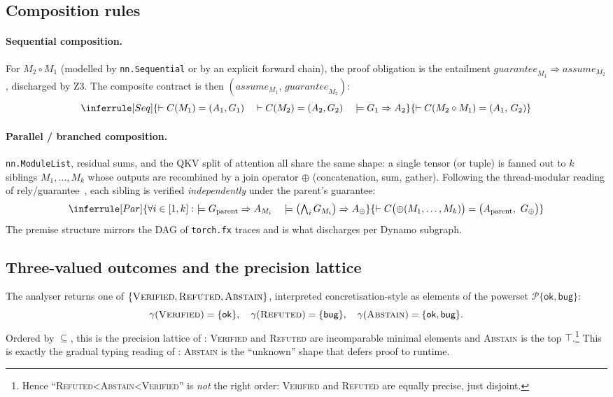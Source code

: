 \subsection{Composition rules}
\label{sec:ag:composition}

\paragraph{Sequential composition.}
For $M_2 \circ M_1$ (modelled by \texttt{nn.Sequential} or by an explicit
forward chain), the proof obligation is the entailment
$\mathit{guarantee}_{M_1}\!\Rightarrow\!\mathit{assume}_{M_2}$,
discharged by Z3. The composite contract is then
$(\mathit{assume}_{M_1},\,\mathit{guarantee}_{M_2})$:
\[
\inferrule[Seq]
{
 \vdash C(M_1)=(A_1,G_1) \quad
 \vdash C(M_2)=(A_2,G_2) \quad
 \models G_1 \Rightarrow A_2
}
{
 \vdash C(M_2 \circ M_1) = (A_1,\,G_2)
}
\]

\paragraph{Parallel / branched composition.}
\texttt{nn.ModuleList}, residual sums, and the QKV split of attention
all share the same shape: a single tensor (or tuple) is fanned out to
$k$ siblings $M_1,\dots,M_k$ whose outputs are recombined by a join
operator $\oplus$ (concatenation, sum, gather). Following the
thread-modular reading of rely/guarantee~\citep{jones1983tentative},
each sibling is verified \emph{independently} under the parent's
guarantee:
\[
\inferrule[Par]
{
 \forall i\in[1,k]:\ \models G_{\text{parent}}\Rightarrow A_{M_i}
 \quad
 \models \bigl(\textstyle\bigwedge_i G_{M_i}\bigr)\Rightarrow A_\oplus
}
{
 \vdash C\bigl(\oplus(M_1,\dots,M_k)\bigr)
 = \bigl(A_{\text{parent}},\ G_\oplus\bigr)
}
\]
The premise structure mirrors the DAG of \texttt{torch.fx} traces and
is what discharges per Dynamo subgraph.

\subsection{Three-valued outcomes and the precision lattice}
\label{sec:ag:three-valued}

The analyser returns one of $\{\textsc{Verified},\textsc{Refuted},\textsc{Abstain}\}$,
interpreted concretisation-style as elements of the powerset
$\mathcal{P}\{\mathsf{ok},\mathsf{bug}\}$:
\[
 \gamma(\textsc{Verified})=\{\mathsf{ok}\},\quad
 \gamma(\textsc{Refuted})=\{\mathsf{bug}\},\quad
 \gamma(\textsc{Abstain})=\{\mathsf{ok},\mathsf{bug}\}.
\]
Ordered by $\subseteq$, this is the precision lattice of
\citet{cousot1977abstract}: \textsc{Verified} and \textsc{Refuted} are
incomparable minimal elements and \textsc{Abstain} is the top
$\top$.\footnote{Hence ``\textsc{Refuted}\!<\!\textsc{Abstain}\!<\!\textsc{Verified}''
is \emph{not} the right order: \textsc{Verified} and \textsc{Refuted}
are equally precise, just disjoint.} This is exactly the gradual
typing reading of \citet{siek2006gradual}: \textsc{Abstain} is the
``unknown'' shape that defers proof to runtime.


